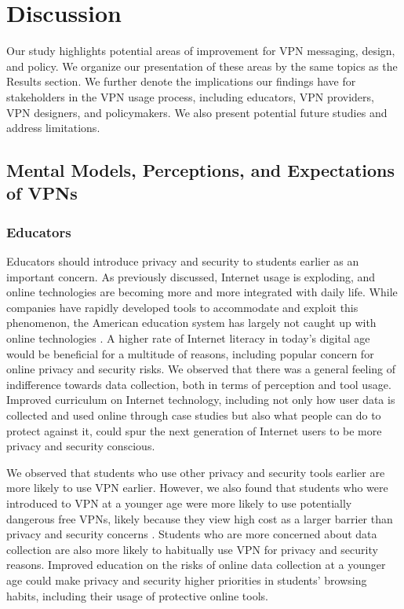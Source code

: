 \section{Discussion}\label{sec:discussion} 

Our study highlights potential areas of improvement for VPN messaging, design,
and policy. We organize our presentation of these areas by the same topics as
the Results section. We further denote the implications our findings have for
stakeholders in the VPN usage process, including educators, VPN providers, VPN
designers, and policymakers. We also present potential future studies and
address limitations.

\subsection{Mental Models, Perceptions, and Expectations of VPNs}
\subsubsection{Educators}

Educators should introduce privacy and security to students earlier as an
important concern. As previously discussed, Internet usage is exploding, and
online technologies are becoming more and more integrated with daily life.
While companies have rapidly developed tools to accommodate and exploit this
phenomenon, the American education system has largely not caught up with
online technologies \cite{levin_29}. A higher rate of Internet literacy in today’s
digital age would be beneficial for a multitude of reasons, including popular
concern for online privacy and security risks. We observed that there was a
general feeling of indifference towards data collection, both in terms of
perception and tool usage. Improved curriculum on Internet technology,
including not only how user data is collected and used online through case
studies but also what people can do to protect against it, could spur the next
generation of Internet users to be more privacy and security conscious.

We observed that students who use other privacy and security tools earlier are
more likely to use VPN earlier. However, we also found that students who were
introduced to VPN at a younger age were more likely to use potentially
dangerous free VPNs, likely because they view high cost as a larger barrier
than privacy and security concerns \cite{taylor_7}. Students who are more concerned about
data collection are also more likely to habitually use VPN for privacy and
security reasons. Improved education on the risks of online data collection at
a younger age could make privacy and security higher priorities in students’
browsing habits, including their usage of protective online tools.

